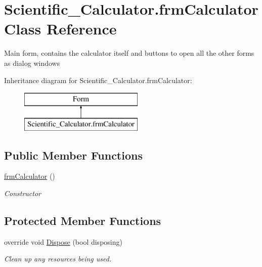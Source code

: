 \hypertarget{class_scientific___calculator_1_1frm_calculator}{}\section{Scientific\+\_\+\+Calculator.\+frm\+Calculator Class Reference}
\label{class_scientific___calculator_1_1frm_calculator}


Main form, contains the calculator itself and buttons to open all the other forms as dialog windows  


Inheritance diagram for Scientific\+\_\+\+Calculator.\+frm\+Calculator\+:\begin{figure}[H]
\begin{center}
\leavevmode
\includegraphics[height=2.000000cm]{class_scientific___calculator_1_1frm_calculator}
\end{center}
\end{figure}
\subsection*{Public Member Functions}
\begin{DoxyCompactItemize}
\item 
\hyperlink{class_scientific___calculator_1_1frm_calculator_a0959073ecdf7a5b1f1bee0b47a56cee9}{frm\+Calculator} ()
\begin{DoxyCompactList}\small\item\em Constructor \end{DoxyCompactList}\end{DoxyCompactItemize}
\subsection*{Protected Member Functions}
\begin{DoxyCompactItemize}
\item 
override void \hyperlink{class_scientific___calculator_1_1frm_calculator_a3839d5570f4cf4bf018fbed788f93823}{Dispose} (bool disposing)
\begin{DoxyCompactList}\small\item\em Clean up any resources being used. \end{DoxyCompactList}\end{DoxyCompactItemize}


